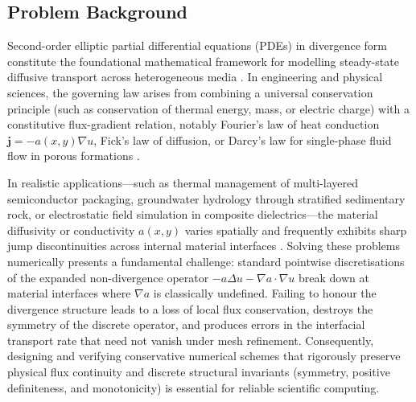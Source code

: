\documentclass[11pt,a4paper]{article}
\theoremstyle{definition}
\theoremstyle{remark}
\begin{document}
\subsection{Problem Background}
Second-order elliptic partial differential equations (PDEs) in divergence form constitute the foundational mathematical framework for modelling steady-state diffusive transport across heterogeneous media \cite{hiptmair2025, quarteroni2017}. In engineering and physical sciences, the governing law arises from combining a universal conservation principle (such as conservation of thermal energy, mass, or electric charge) with a constitutive flux-gradient relation, notably Fourier's law of heat conduction $\bm{j} = -a(x,y)\nabla u$, Fick's law of diffusion, or Darcy's law for single-phase fluid flow in porous formations \cite{hackbusch2017, hiptmair2025}.

In realistic applications---such as thermal management of multi-layered semiconductor packaging, groundwater hydrology through stratified sedimentary rock, or electrostatic field simulation in composite dielectrics---the material diffusivity or conductivity $a(x,y)$ varies spatially and frequently exhibits sharp jump discontinuities across internal material interfaces \cite{quarteroni2017}. Solving these problems numerically presents a fundamental challenge: standard pointwise discretisations of the expanded non-divergence operator $-a\Delta u - \nabla a \cdot \nabla u$ break down at material interfaces where $\nabla a$ is classically undefined. Failing to honour the divergence structure leads to a loss of local flux conservation, destroys the symmetry of the discrete operator, and produces errors in the interfacial transport rate that need not vanish under mesh refinement. Consequently, designing and verifying conservative numerical schemes that rigorously preserve physical flux continuity and discrete structural invariants (symmetry, positive definiteness, and monotonicity) is essential for reliable scientific computing.
\end{document}
